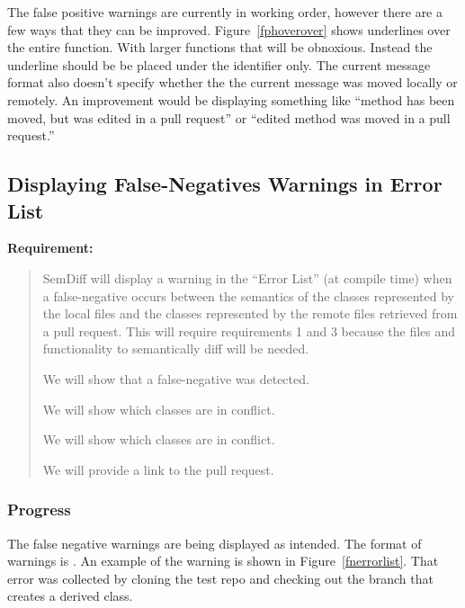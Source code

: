 \documentclass[draftclsnofoot,onecolumn]{IEEEtran}
\begin{document}
The false positive warnings are currently in working order, however there are a 
few ways that they can be improved. Figure~\ref{fphoverover} shows underlines 
over the entire function. With larger functions that will be obnoxious. Instead 
the underline should be be placed under the identifier only. The current 
message format also doesn’t specify whether the the current message was moved 
locally or remotely. An improvement would be displaying something like “method 
has been moved, but was edited in a pull request” or “edited method was moved 
in a pull request.”

\subsection{Displaying False-Negatives Warnings in Error List}%

\textbf{Requirement:}

\begin{quote}

SemDiff will display a warning in the “Error List” (at compile time) when a 
false-negative occurs between the semantics of the classes represented by the 
local files and the classes represented by the remote files retrieved from a 
pull request. This will require requirements 1 and 3 because the files and 
functionality to semantically diff will be needed.

We will show that a false-negative was detected.

We will show which classes are in conflict.

We will show which classes are in conflict.

We will provide a link to the pull request.

\end{quote}

\subsubsection{Progress}

The false negative warnings are being displayed as intended. The format of 
warnings is . An example of the 
warning is shown in Figure~\ref{fnerrorlist}. That error was collected by 
cloning the test repo and checking out the branch that creates a derived class.
\end{document}
